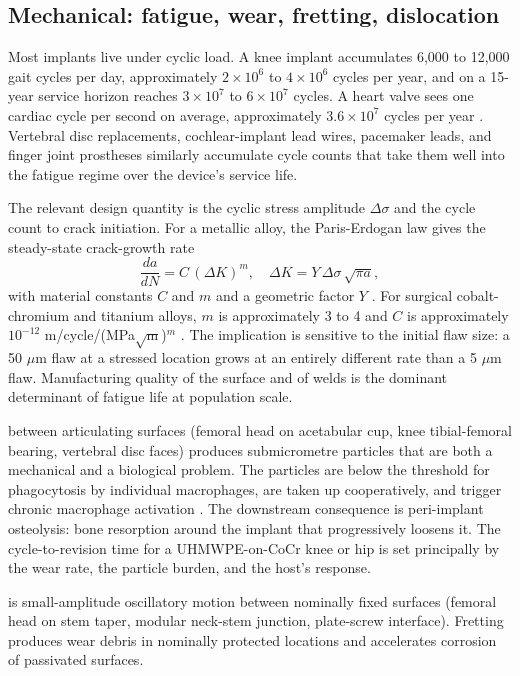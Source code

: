 \subsection{Mechanical: fatigue, wear, fretting, dislocation}

Most implants live under cyclic load. A knee implant accumulates
6,000 to 12,000 gait cycles per day, approximately
$2 \times 10^6$ to $4 \times 10^6$ cycles per year, and on a
15-year service horizon reaches $3 \times 10^7$ to $6 \times 10^7$
cycles. A heart valve sees one cardiac cycle per second on
average, approximately $3.6 \times 10^7$ cycles per year
\cite{paper:v6c12-grunkemeier-mechanical-valve-2000}. Vertebral
disc replacements, cochlear-implant lead wires, pacemaker leads,
and finger joint prostheses similarly accumulate cycle counts
that take them well into the fatigue regime over the device's
service life.

The relevant design quantity is the cyclic stress amplitude
$\Delta \sigma$ and the cycle count to crack initiation. For a
metallic alloy, the Paris-Erdogan law gives the steady-state
crack-growth rate
\[
\frac{da}{dN} = C \, (\Delta K)^m, \quad
\Delta K = Y \, \Delta \sigma \, \sqrt{\pi a},
\]
with material constants $C$ and $m$ and a geometric factor $Y$
\cite{paper:v6c12-paris-erdogan-1963}. For surgical cobalt-chromium
and titanium alloys, $m$ is approximately 3 to 4 and $C$ is
approximately $10^{-12}$ m/cycle/(MPa$\sqrt{\text{m}}$)$^m$
\cite{text:v6c12-callister-materials-2018}. The implication is
sensitive to the initial flaw size: a 50 $\mu$m flaw at a stressed
location grows at an entirely different rate than a 5 $\mu$m flaw.
Manufacturing quality of the surface and of welds is the dominant
determinant of fatigue life at population scale.

 between articulating surfaces (femoral head on
acetabular cup, knee tibial-femoral bearing, vertebral disc faces)
produces submicrometre particles that are both a mechanical and a
biological problem. The particles are below the threshold for
phagocytosis by individual macrophages, are taken up cooperatively,
and trigger chronic macrophage activation
\cite{paper:v6c12-rejman-nanoparticle-2004}. The downstream
consequence is peri-implant osteolysis: bone resorption around the
implant that progressively loosens it. The cycle-to-revision time
for a UHMWPE-on-CoCr knee or hip is set principally by the wear
rate, the particle burden, and the host's response.

 is small-amplitude oscillatory motion between
nominally fixed surfaces (femoral head on stem taper, modular
neck-stem junction, plate-screw interface). Fretting produces wear
debris in nominally protected locations and accelerates corrosion
of passivated surfaces.

